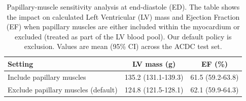 \documentclass[fleqn,10pt]{wlscirep}
\begin{document}
\begin{table}[!htbp]
  \caption{Papillary-muscle sensitivity analysis at end-diastole (ED). The table shows the impact on calculated Left Ventricular (LV) mass and Ejection Fraction (EF) when papillary muscles are either included within the myocardium or excluded (treated as part of the LV blood pool). Our default policy is exclusion. Values are mean (95\% CI) across the ACDC test set.}
  \label{tab:papillary_sensitivity}
  \centering
  \begin{tabular}{lcc}
    \toprule
    Setting & LV mass (g) & EF (\%) \\
    \midrule
    Include papillary muscles & 135.2 (131.1-139.3) & 61.5 (59.2-63.8) \\
    Exclude papillary muscles (default) & 124.8 (121.5-128.1) & 62.1 (59.9-64.3) \\
    \bottomrule
  \end{tabular}
\end{table}
\end{document}

